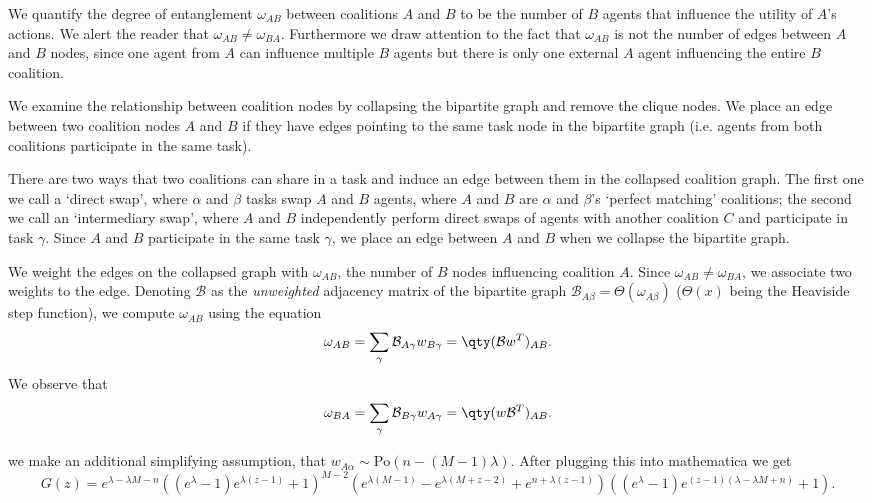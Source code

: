 We quantify the degree of entanglement $\omega_{AB}$ between coalitions $A$ and $B$ to be the number of $B$ agents that influence the utility of $A$'s actions. We alert the reader that $\omega_{AB} \neq \omega_{BA}$. Furthermore we draw attention to the fact that $\omega_{AB}$ is not the number of edges between $A$ and $B$ nodes, since one agent from $A$ can influence multiple $B$ agents but there is only one external $A$ agent influencing the entire $B$ coalition.

We examine the relationship between coalition nodes by collapsing the bipartite graph and remove the clique nodes. We place an edge between two coalition nodes $A$ and $B$ if they have edges pointing to the same task node in the bipartite graph (i.e. agents from both coalitions participate in the same task).

There are two ways that two coalitions can share in a task and induce an edge between them in the collapsed coalition graph. The first one we call a `direct swap', where $\alpha$ and $\beta$ tasks swap $A$ and $B$ agents, where $A$ and $B$ are $\alpha$ and $\beta$'s `perfect matching' coalitions; the second we call an `intermediary swap',  where $A$ and $B$ independently perform direct swaps of agents with another coalition $C$ and participate in task $\gamma$. Since $A$ and $B$ participate in the same task $\gamma$, we place an edge between $A$ and $B$ when we collapse the bipartite graph.

We weight the edges on the collapsed graph with $\omega_{AB}$, the number of $B$ nodes influencing coalition $A$. Since $\omega_{AB} \neq \omega_{BA}$, we associate two weights to the edge. Denoting $\mathcal{B}$ as the \emph{unweighted} adjacency matrix of the bipartite graph $\mathcal{B}_{A\beta} = \Theta(\omega_{A\beta})$ ($\Theta(x)$ being the Heaviside step function), we compute $\omega_{AB}$ using the equation
\begin{equation}\label{eq:omegaab}
\omega_{AB} = \sum_{\gamma} \mathcal{B}_{A\gamma}w_{B\gamma} = \qty(\mathcal{B}w^T)_{AB}.
\end{equation}
We observe that
\begin{equation}
\omega_{BA} = \sum_{\gamma} \mathcal{B}_{B\gamma}w_{A\gamma} = \qty(w\mathcal{B}^T)_{AB}.
\end{equation}

we make an additional simplifying assumption, that $w_{A\alpha} \sim \text{Po}(n-(M-1)\lambda)$. After plugging this into mathematica we get
\begin{equation}
G(z) = e^{\lambda -\lambda  M-n} \left(\left(e^{\lambda }-1\right) e^{\lambda  (z-1)}+1\right)^{M-2} \left(e^{\lambda  (M-1)}-e^{\lambda  (M+z-2)}+e^{n+\lambda  (z-1)}\right) \left(\left(e^{\lambda }-1\right)
   e^{(z-1) (\lambda -\lambda  M+n)}+1\right).
\end{equation}

